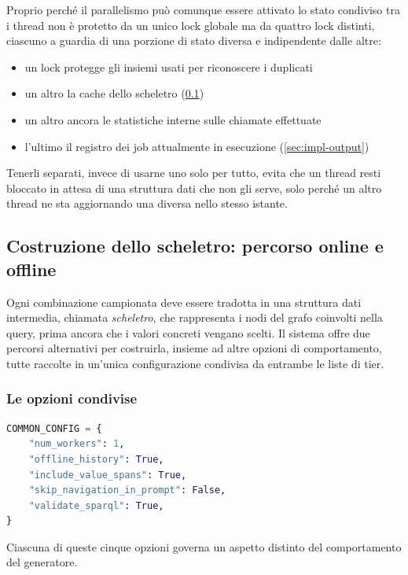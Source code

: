 \documentclass[12pt,a4paper,openright,twoside]{book}
\begin{document}
Proprio perché il parallelismo può comunque essere attivato lo stato condiviso
tra i thread non è protetto da un unico lock globale ma da quattro lock
distinti, ciascuno a guardia di una porzione di stato diversa e indipendente
dalle altre:
\begin{itemize}
    \item un lock protegge gli insiemi usati per riconoscere i duplicati
    \item un altro la cache dello scheletro (\cref{sec:impl-skeleton})
    \item un altro ancora le statistiche interne sulle chiamate effettuate
    \item l'ultimo il registro dei job attualmente in esecuzione
          (\cref{sec:impl-output})
\end{itemize}
Tenerli separati, invece di usarne uno solo per tutto, evita che un thread resti
bloccato in attesa di una struttura dati che non gli serve, solo perché un altro
thread ne sta aggiornando una diversa nello stesso istante.

\subsection{Costruzione dello scheletro: percorso online e offline}
\label{sec:impl-skeleton}

Ogni combinazione campionata deve essere tradotta in una struttura dati
intermedia, chiamata \emph{scheletro}, che rappresenta i nodi del grafo
coinvolti nella query, prima ancora che i valori concreti vengano scelti. Il
sistema offre due percorsi alternativi per costruirla, insieme ad altre opzioni
di comportamento, tutte raccolte in un'unica configurazione condivisa da
entrambe le liste di tier.

\subsubsection{Le opzioni condivise}
\label{sec:impl-config}

\begin{lstlisting}[language=Python, caption={Configurazione condivisa usata nei run di produzione, per entrambe le liste di tier.}, label={lst:common-config}]
COMMON_CONFIG = {
    "num_workers": 1,
    "offline_history": True,
    "include_value_spans": True,
    "skip_navigation_in_prompt": False,
    "validate_sparql": True,
}
\end{lstlisting}

Ciascuna di queste cinque opzioni governa un aspetto distinto del comportamento
del generatore.
\end{document}
